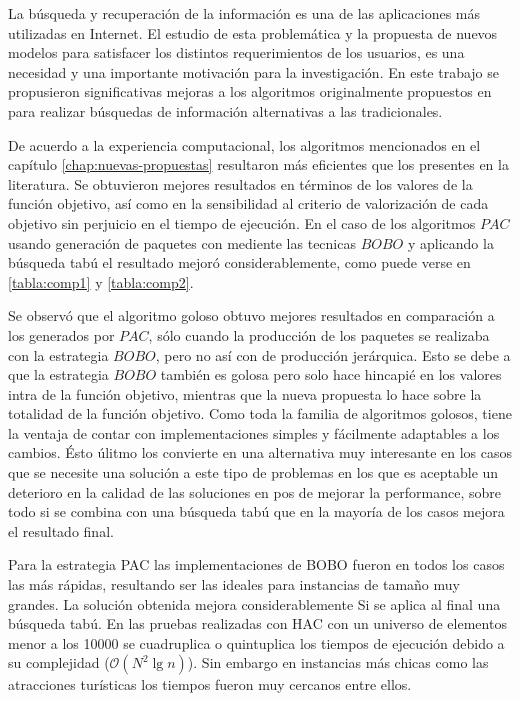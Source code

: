 La búsqueda y recuperación de la información es una de las aplicaciones más utilizadas en Internet. El estudio de esta problemática y la propuesta de nuevos modelos para satisfacer los distintos requerimientos de los usuarios, es una necesidad y una importante motivación para la investigación. En este trabajo se propusieron significativas mejoras a los algoritmos originalmente propuestos en \cite{journals/tkde/Amer-YahiaBCFMZ14} para realizar búsquedas de información alternativas a las tradicionales.

De acuerdo a la experiencia computacional, los algoritmos mencionados en el capítulo \autoref{chap:nuevas-propuestas} resultaron más eficientes que los presentes en la literatura. Se obtuvieron mejores resultados en términos de los valores de la función objetivo, así como en la sensibilidad al criterio de valorización de cada objetivo sin perjuicio en el tiempo de ejecución. En el caso de los algoritmos $PAC$ usando generación de paquetes con mediente las tecnicas $BOBO$ y aplicando la búsqueda tabú el resultado mejoró considerablemente, como puede verse en \autoref{tabla:comp1} y \autoref{tabla:comp2}.

Se observó que el algoritmo goloso obtuvo mejores resultados en comparación a los generados por $PAC$, sólo cuando la producción de los paquetes se realizaba con la estrategia $BOBO$, pero no así con de producción jerárquica. Esto se debe a que la estrategia $BOBO$ también es golosa pero solo hace hincapié en los valores intra de la función objetivo, mientras que la nueva propuesta lo hace sobre la totalidad de la función objetivo. Como toda la familia de algoritmos golosos, tiene la ventaja de contar con implementaciones simples y fácilmente adaptables a los cambios. Ésto úlitmo los convierte en una alternativa muy interesante en los casos que se necesite una solución a este tipo de problemas en los que es aceptable un deterioro en la calidad de las soluciones en pos de mejorar la performance, sobre todo si se combina con una búsqueda tabú que en la mayoría de los casos mejora el resultado final.

Para la estrategia PAC las implementaciones de BOBO fueron en todos los casos las más rápidas, resultando ser las ideales para instancias de tamaño muy grandes. La solución obtenida mejora considerablemente Si se aplica al final una búsqueda tabú. En las pruebas realizadas con HAC con un universo de elementos menor a los 10000 se cuadruplica o quintuplica los tiempos de ejecución debido a su complejidad ($\mathcal{O}(N^{2}\lg n)$). Sin embargo en instancias más chicas como las atracciones turísticas los tiempos fueron muy cercanos entre ellos.

